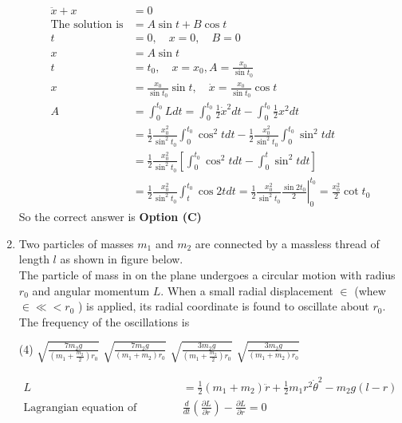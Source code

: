 \begin{enumerate}
\begin{answer}
\begin{align*}
	\ddot{x}+x&=0\\
	\text{The solution is}&=A \sin t+B \cos t\\
	t&=0, \quad x=0, \quad B=0\\
	x&=A \sin t\\
	t&=t_{0}, \quad x=x_{0}, A=\frac{x_{0}}{\sin t_{0}}\\
	x&=\frac{x_{0}}{\sin t_{0}} \sin t, \quad \dot{x}=\frac{x_{0}}{\sin t_{0}} \cos t\\
	A&=\int_{0}^{t_{0}} L d t=\int_{0}^{t_{0}} \frac{1}{2} \dot{x}^{2} d t-\int_{0}^{t_{0}} \frac{1}{2} x^{2} d t\\&=\frac{1}{2} \frac{x_{0}^{2}}{\sin ^{2} t_{0}} \int_{0}^{t_{0}} \cos ^{2} t d t-\frac{1}{2} \frac{x_{0}^{2}}{\sin ^{2} t_{0}} \int_{0}^{t_{0}} \sin ^{2} t d t\\
	&=\frac{1}{2} \frac{x_{0}^{2}}{\sin ^{2} t_{0}}\left[\int_{0}^{t_{0}} \cos ^{2} t d t-\int_{0}^{t} \sin ^{2} t d t\right]\\&=\frac{1}{2} \frac{x_{0}^{2}}{\sin ^{2} t_{0}} \int_{t}^{t_{0}} \cos 2 t d t=\left.\frac{1}{2} \frac{x_{0}^{2}}{\sin ^{2} t_{0}} \frac{\sin 2 t_{0}}{2}\right|_{0} ^{t_{0}}=\frac{x_{0}^{2}}{2} \cot t_{0}
	\end{align*}
	So the correct answer is \textbf{Option (C)}
\end{answer}
	\item Two particles of masses $m_{1}$ and $m_{2}$ are connected by a massless thread of length $l$ as shown in figure below.\\
	The particle of mass in on the plane undergoes a circular motion with radius $r_{0}$ and angular momentum $L$. When a small radial displacement $\in$ (whew $\in \ll<r_{0}$ ) is applied, its radial coordinate is found to oscillate about $r_{0}$. The frequency of the oscillations is
	{}
	\begin{tasks}(4)
		\task[\textbf{A.}] $\sqrt{\frac{7 m_{2} g}{\left(m_{1}+\frac{m_{2}}{2}\right) r_{0}}}$
		\task[\textbf{B.}] $\sqrt{\frac{7 m_{2} g}{\left(m_{1}+m_{2}\right) r_{0}}}$
		\task[\textbf{C.}] $\sqrt{\frac{3 m_{2} g}{\left(m_{1}+\frac{m_{2}}{2}\right) r_{0}}}$
		\task[\textbf{D.}] $\sqrt{\frac{3 m_{2} g}{\left(m_{1}+m_{2}\right) r_{0}}}$
	\end{tasks}
\begin{answer}
	\begin{align*}
	L&=\frac{1}{2}\left(m_{1}+m_{2}\right) \ddot{r}+\frac{1}{2} m_{1} r^{2} \dot{\theta}^{2}-m_{2} g(l-r)\\
	\text{Lagrangian equation of motion; }&\frac{d}{d t}\left(\frac{\partial L}{\partial \dot{r}}\right)-\frac{\partial L}{\partial r}=0\\

\end{align*}
\end{answer}
\end{enumerate}
